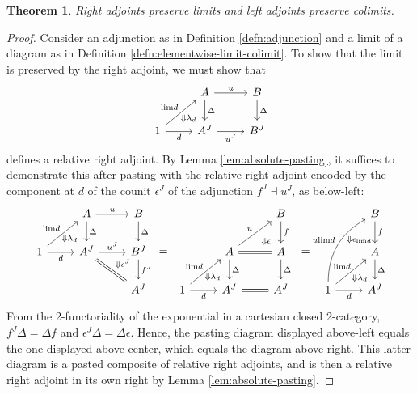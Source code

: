 \documentclass[11pt]{ctexart}
\newtheorem{thm}{Theorem}[section]
\theoremstyle{definition}
\theoremstyle{remark}
\numberwithin{equation}{section}
\renewcommand{\lim}{\textup{lim}}
\newcommand{\1}{\mathbbe{1}}
\newcommand{\2}{\mathbbe{2}}
\newcommand{\3}{\mathbbe{3}}
\begin{document}
\begin{thm}
    Right adjoints preserve limits and left adjoints preserve colimits.
\end{thm}
\begin{proof}
    Consider an adjunction as in Definition \ref{defn:adjunction} and a limit of a diagram as in Definition \ref{defn:elementwise-limit-colimit}. To show that the limit is preserved by the right adjoint, we must show that
    \[
        \begin{tikzcd}
        \arrow[dr, phantom, "\scriptstyle\Downarrow\lambda_d" very near end] & A \arrow[d, "\Delta"]  \arrow[r, "u"] & B \arrow[d, "\Delta"] \\ 1 \arrow[r, "d"']  \arrow[ur, "\lim d"] & A^J \arrow[r, "u^J"'] & B^J
        \end{tikzcd}
    \]
    defines a relative right adjoint. By Lemma \ref{lem:absolute-pasting}, it suffices to demonstrate this after pasting with the relative right adjoint encoded by the component at $d$ of the counit $\epsilon^J$ of the adjunction $f^J \dashv u^J$, as below-left:
    \[
\begin{tikzcd}
\arrow[dr, phantom, "\scriptstyle\Downarrow\lambda_d" pos=.85] & A \arrow[d, "\Delta"]\arrow[r, "u"] & B \arrow[d, "\Delta"] & [-3pt]{~} &\arrow[dr, phantom, "\scriptstyle\Downarrow\epsilon" pos=.85] & B \arrow[d, "f"]  & \arrow[dr, phantom, "\scriptstyle\Downarrow\epsilon_{\lim d}" pos=.8] & B \arrow[d, "f"] \\  1 \arrow[ur, "\lim d"] \arrow[r, "d"'] & A^J \arrow[dr, equals] \arrow[r, "{u^J}"] & B^J \arrow[d, "{f^J}"] \arrow[dl, phantom, "{\scriptstyle\Downarrow\epsilon^J}" pos=.15] \arrow[r, phantom, "="] & ~ \arrow[dr, phantom, "\scriptstyle\Downarrow\lambda_d" pos=.85]  & A \arrow[ur, "u"] \arrow[r, equals] \arrow[d, "\Delta"] & A \arrow[d, "\Delta"]
  \arrow[r, phantom, "="] & ~ \arrow[dr, phantom, "\scriptstyle\Downarrow\lambda_d" pos=.9] & A \arrow[d, "\Delta"] \\ & ~ & A^J & 1 \arrow[r, "d"'] \arrow[ur, "\lim d"] & A^J \arrow[r, equals] & A^J & 1 \arrow[r, "d"'] \arrow[ur, "\lim d" {xshift=2pt}] \arrow[uur, bend left, "u\lim d"] & A^J
\end{tikzcd}
\]
From the 2-functoriality of the exponential in a cartesian closed 2-category,
$f^J\Delta = \Delta f$ and $\epsilon^J \Delta = \Delta \epsilon$. Hence, the pasting diagram displayed above-left equals the one displayed above-center, which equals the diagram above-right. This latter diagram is a pasted composite of relative right adjoints, and is then a relative right adjoint in its own right by Lemma \ref{lem:absolute-pasting}.
\end{proof}
\end{document}
